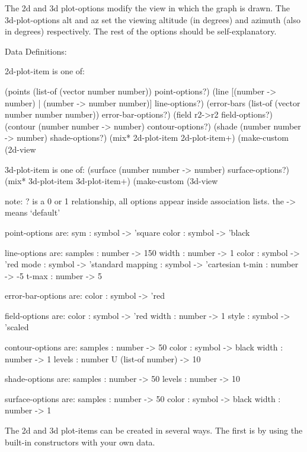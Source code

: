 \documentclass{article}
\begin{document}
{\begin{schemedisplay}
\end{schemedisplay}



The 2d and 3d plot-options modify the view in which the graph is drawn. The 3d-plot-options alt and az set the viewing altitude (in degrees) and azimuth (also in degrees) respectively. The rest of the options should be self-explanatory.



\begin{schemedisplay}
Data Definitions:
     
2d-plot-item is one of:

 (points (list-of (vector number number)) point-options?)
 (line [(number -> number) | (number -> number number)] line-options?)
 (error-bars (list-of (vector number number number)) error-bar-options?)
 (field r2->r2 field-options?)
 (contour (number number -> number) contour-options?)
 (shade (number number -> number) shade-options?)
 (mix* 2d-plot-item 2d-plot-item+)
 (make-custom (2d-view%
     
3d-plot-item is one of:
 (surface (number number -> number) surface-options?)
 (mix* 3d-plot-item 3d-plot-item+)
 (make-custom (3d-view%

note: ? is a 0 or 1 relationship, all options appear inside association lists.
the -> means `default'

point-options are:
 sym : symbol -> 'square
 color : symbol -> 'black

line-options are:
 samples : number -> 150
 width : number -> 1
 color : symbol -> 'red
 mode : symbol -> 'standard
 mapping : symbol -> 'cartesian
 t-min : number -> -5
 t-max : number -> 5
 
error-bar-options are:
 color : symbol -> 'red

field-options are:
 color : symbol -> 'red
 width : number -> 1
 style : symbol -> 'scaled

contour-options are:
 samples : number -> 50
 color : symbol -> black
 width : number -> 1
 levels : number U (list-of number) -> 10

shade-options are:
 samples : number -> 50
 levels : number -> 10

surface-options are:
 samples : number -> 50
 color : symbol -> black
 width : number -> 1
\end{schemedisplay}



The 2d and 3d plot-items can be created in several ways. The first is by using the built-in constructors with your own data. 


}
\end{document}
